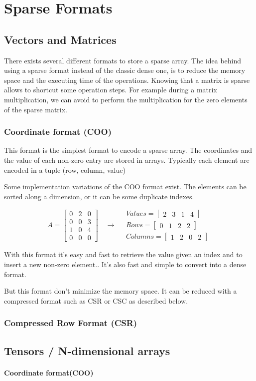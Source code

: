 \chapter{Sparse Formats}

\section{Vectors and Matrices}


There exists several different formats to store a sparse array. The idea behind using a sparse format instead of the classic dense one, is to reduce the memory space and the executing time of the operations. Knowing that a matrix is sparse allows to shortcut some operation steps. For example during a matrix multiplication, we can avoid to perform the multiplication for the zero elements of the sparse matrix.

\subsection{Coordinate format (COO)}

This format is the simplest format to encode a sparse array. The coordinates and the value of each non-zero entry are stored in arrays.
Typically each element are encoded in a tuple (row, column, value)

Some implementation variations of the COO format exist. The elements can be sorted along a dimension, or it can be some duplicate indexes.


\[
A = 
\begin{bmatrix}
0 &  2 & 0 \\
0 &  0 & 3 \\
1 &  0 & 4\\
0 &  0 & 0
\end{bmatrix}
\quad\rightarrow\quad
\begin{aligned}
Values = 
\begin{bmatrix}
2 &  3 & 1 & 4
\end{bmatrix}
\\
Rows = 
\begin{bmatrix}
0 &  1 & 2 & 2
\end{bmatrix}
\\
Columns = 
\begin{bmatrix}
1 &  2 & 0 & 2
\end{bmatrix}
\end{aligned}
\]

With this format it's easy and fast to retrieve the value given an index and to insert a new non-zero element.. It's also fast and simple to convert into a dense format.

But this format don't minimize the memory space. It can be reduced with a compressed format such as CSR or CSC as described below.

\subsection{Compressed Row Format (CSR)}


\section{Tensors / N-dimensional arrays}

\subsubsection{Coordinate format(COO)}
